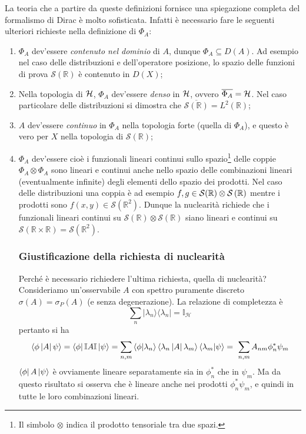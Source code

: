 \documentclass[../../FisicaTeorica.tex]{subfiles}
\begin{document}
La teoria che a partire da queste definizioni fornisce una spiegazione completa del formalismo di Dirac è molto sofisticata. Infatti è necessario fare le seguenti ulteriori richieste nella definizione di $\Phi_A$:
\begin{enumerate}
    \item $\Phi_A$ dev'essere \emph{contenuto nel dominio} di $A$, dunque $\displaystyle \Phi_A\subseteq D\left(A\right)$. Ad esempio nel caso delle distribuzioni e dell'operatore posizione, lo spazio delle funzioni di prova $\mathcal S\left(\mathbb{R}\right)$ è contenuto in $D(X)$;
	\item Nella topologia di $\mathcal{H}$, $\Phi_A$ dev'essere \emph{denso} in $\mathcal{H}$, ovvero $\overline{\Phi_A} = \mathcal{H}$. Nel caso particolare delle distribuzioni si dimostra che $\overline{\mathcal{S}\left(\mathbb{R}\right)} = L^2(\mathbb R)$;
	\item $A$ dev'essere \emph{continuo} in $\Phi_A$ nella topologia forte (quella di $\Phi_A$), e questo è vero per $X$ nella topologia di $\mathcal S\left(\mathbb{R}\right)$;
	\item $\Phi_A$ dev'essere  cioè i funzionali lineari continui sullo spazio\footnote{Il simbolo $\otimes$ indica il prodotto tensoriale tra due spazi.} delle coppie $\Phi_A\otimes \Phi_A$ sono lineari e continui anche nello spazio delle combinazioni lineari (eventualmente infinite) degli elementi dello spazio dei prodotti. Nel caso delle distribuzioni una coppia è ad esempio $f,g\in \mathcal{S}(\mathbb{R})\otimes \mathcal{S}\left(\mathbb{R}\right)$ mentre i prodotti sono $f\left(x,y\right)\in \mathcal S\left(\mathbb{R}^2\right)$. Dunque la nuclearità richiede che i funzionali lineari continui su $\mathcal{S}\left(\mathbb{R}\right)\otimes \mathcal{S}\left(\mathbb{R}\right)$ siano lineari e continui su $\mathcal S(\mathbb R \times \mathbb R) = \mathcal{S}(\mathbb{R}^2)$.
	
	\subsubsection{Giustificazione della richiesta di nuclearità}
	Perché è necessario richiedere l'ultima richiesta, quella di nuclearità? 
	Consideriamo un'osservabile $A$ con spettro puramente discreto $\sigma \left(A\right)=\sigma_P(A)$ (e senza degenerazione). La relazione di completezza è
	\[
	\sum_{n}{|\lambda_n\rangle \langle\lambda_n|}=\mathbb{I}_\mathcal{H}
	\]
	pertanto si ha
	\[
	\left\langle\phi\left|A\right|\psi\right\rangle = \bra\phi\mathbb{I}A\mathbb{I}\ket\psi
	= \sum_{n,m}{\left\langle\phi\middle|\lambda_n\right\rangle\left\langle\lambda_n\left|A\right|\lambda_m\right\rangle\left\langle\lambda_m\middle|\psi\right\rangle}
	= \ \sum_{n,m}{A_{nm}\phi_n^\ast\psi_{m}}
	\]
	$\bra\phi A \ket\psi$ è ovviamente lineare separatamente sia in $\phi_n^\ast$ che in $\psi_m$. Ma da questo risultato si osserva che è lineare anche nei prodotti $\phi_n^\ast\psi_m$, e quindi in tutte le loro combinazioni lineari.
	

\end{enumerate}
\end{document}
